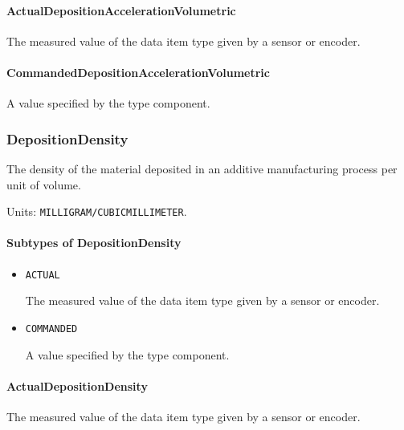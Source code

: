 \paragraph{ActualDepositionAccelerationVolumetric}\mbox{}
\label{sec:ActualDepositionAccelerationVolumetric}


The measured value of the data item type given by a sensor or encoder.


\paragraph{CommandedDepositionAccelerationVolumetric}\mbox{}
\label{sec:CommandedDepositionAccelerationVolumetric}


A value specified by the  type component.


\subsubsection{DepositionDensity}
\label{sec:DepositionDensity}



The density of the material deposited in an additive manufacturing process per unit of volume.


Units: \texttt{MILLIGRAM/CUBIC\textunderscore MILLIMETER}.

\paragraph{Subtypes of DepositionDensity}\mbox{}
\label{sec:Subtypes of DepositionDensity}

\begin{itemize}

\item \texttt{ACTUAL}


The measured value of the data item type given by a sensor or encoder.

\item \texttt{COMMANDED}


A value specified by the  type component.


\end{itemize}

\paragraph{ActualDepositionDensity}\mbox{}
\label{sec:ActualDepositionDensity}


The measured value of the data item type given by a sensor or encoder.


